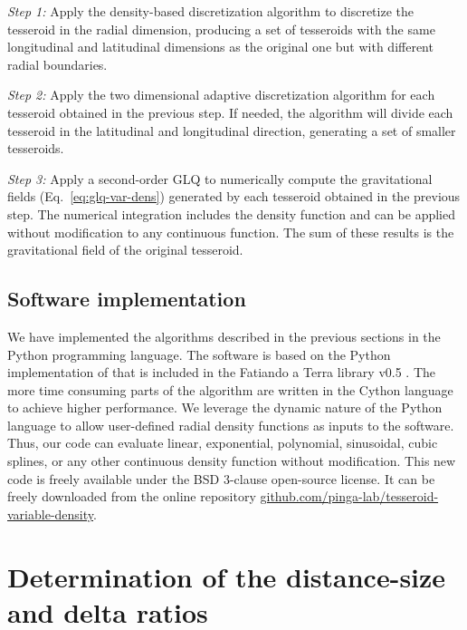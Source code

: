 \documentclass[extra, referee]{gji}
\begin{document}
\textit{Step 1:}
Apply the density-based discretization algorithm to discretize the tesseroid in the
radial dimension, producing a set of tesseroids with the same longitudinal and
latitudinal dimensions as the original one but with different radial boundaries.

\textit{Step 2:}
Apply the two dimensional adaptive discretization algorithm for each tesseroid obtained
in the previous step.
If needed, the algorithm will divide each tesseroid in the latitudinal and longitudinal
direction, generating a set of smaller tesseroids.

\textit{Step 3:}
Apply a second-order GLQ to numerically compute the gravitational fields
(Eq.~\ref{eq:glq-var-dens}) generated by each tesseroid obtained in the
previous step.
The numerical integration includes the density function and can be applied
without modification to any continuous function.
The sum of these results is the gravitational field of the original tesseroid.


\subsection{Software implementation}

We have implemented the algorithms described in the previous sections in the Python
programming language.
The software is based on the Python implementation of \citet{Uieda2016} that is included
in the Fatiando a Terra library v0.5 \citep{Uieda2013}.
The more time consuming parts of the algorithm are written in the Cython language to
achieve higher performance.
We leverage the dynamic nature of the Python language to allow user-defined radial
density functions as inputs to the software.
Thus, our code can evaluate linear, exponential, polynomial, sinusoidal, cubic splines,
or any other continuous density function without modification.
This new code is freely available under the BSD 3-clause open-source license.
It can be freely downloaded from the online repository
\href{https://github.com/pinga-lab/tesseroid-variable-density}{github.com/pinga-lab/tesseroid-variable-density}.




\section{Determination of the distance-size and delta ratios}
\end{document}
